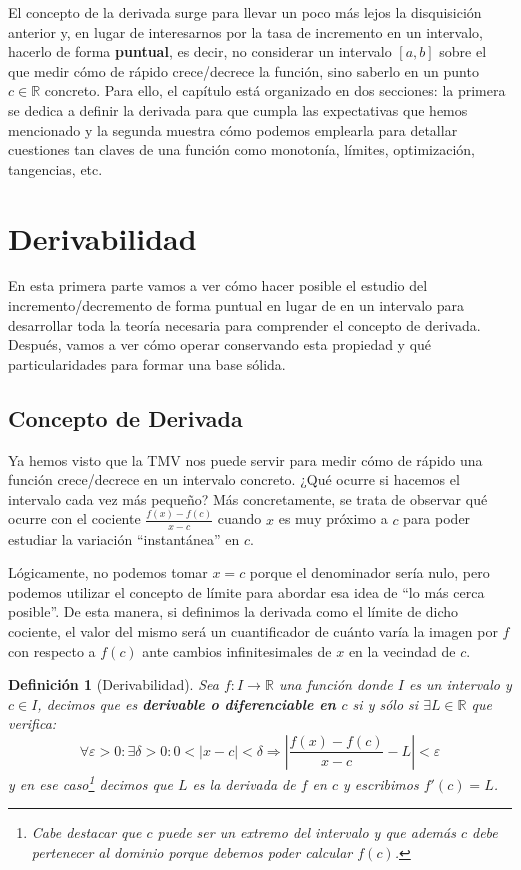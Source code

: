 \documentclass[10pt,a4paper,openright]{book}
\theoremstyle{break}
\newtheorem{defi}{Definición}[chapter]
\begin{document}
El concepto de la derivada surge para llevar un poco más lejos la disquisición anterior y, en lugar de interesarnos por la tasa de incremento en un intervalo, hacerlo de forma \textbf{puntual}, es decir, no considerar un intervalo $[a,b]$ sobre el que medir cómo de rápido crece/decrece la función, sino saberlo en un punto $c\in \mathbb R$ concreto. Para ello, el capítulo está organizado en dos secciones: la primera se dedica a definir la derivada para que cumpla las expectativas que hemos mencionado y la segunda muestra cómo podemos emplearla para detallar cuestiones tan claves de una función como monotonía, límites, optimización, tangencias, etc.

\section{Derivabilidad}
En esta primera parte vamos a ver cómo hacer posible el estudio del incremento/decremento de forma puntual en lugar de en un intervalo para desarrollar toda la teoría necesaria para comprender el concepto de derivada. Después, vamos a ver cómo operar conservando esta propiedad y qué particularidades para formar una base sólida.

\subsection{Concepto de Derivada}
Ya hemos visto que la TMV nos puede servir para medir cómo de rápido una función crece/decrece en un intervalo concreto. ¿Qué ocurre si hacemos el intervalo cada vez más pequeño? Más concretamente, se trata de observar qué ocurre con el cociente $\frac{f(x) - f(c)}{x-c}$ cuando $x$ es muy próximo a $c$ para poder estudiar la variación ``instantánea'' en $c$.

Lógicamente, no podemos tomar $x=c$ porque el denominador sería nulo, pero podemos utilizar el concepto de límite para abordar esa idea de ``lo más cerca posible''. De esta manera, si definimos la derivada como el límite de dicho cociente, el valor del mismo será un cuantificador de cuánto varía la imagen por $f$ con respecto a $f(c)$ ante cambios infinitesimales de $x$ en la vecindad de $c$.

\begin{defi}[Derivabilidad]
Sea $f: I\rightarrow \mathbb R$ una función donde $I$ es un intervalo y $c\in I$, decimos que es \textbf{derivable o diferenciable en $c$} si y sólo si $\exists L\in \mathbb R$ que verifica:
$$\forall \varepsilon>0: \exists \delta>0 : 0<|x-c|<\delta\Rightarrow \left|\frac{f(x)-f(c)}{x-c}-L\right|<\varepsilon$$
y en ese caso\footnote{Cabe destacar que $c$ puede ser un extremo del intervalo y que además $c$ debe pertenecer al dominio porque debemos poder calcular $f(c)$.} decimos que $L$ es la derivada de $f$ en $c$ y escribimos $f'(c)=L$.
\end{defi}
\end{document}
